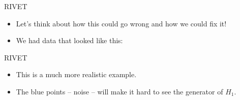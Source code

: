 \documentclass[usenames,dvipsnames,aspectratio=1610]{beamer}
\begin{document}

\begin{frame}{RIVET}
\begin{itemize}
\item Let's think about how this could go wrong and how we could fix it!
\item We had data that looked like this:
\begin{figure}
\end{figure} 
\end{itemize}
\end{frame}


\begin{frame}{RIVET}
\begin{itemize}
\item<1-> This is a much more realistic example.
\item<2-> The blue points -- noise -- will make it hard to see the generator of $H_1$.
\begin{figure}
\end{figure} 
\end{itemize}
\end{frame}

\end{document}
